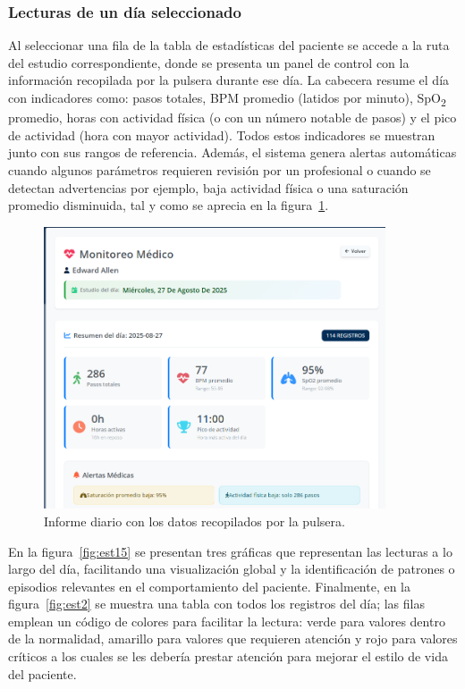 \documentclass[12pt, a4paper]{article}
\begin{document}
\begin{umaappendices}
	\subsubsection{Lecturas de un día seleccionado}

	Al seleccionar una fila de la tabla de estadísticas del paciente se accede a la ruta del estudio correspondiente, donde se presenta un panel de control con la información recopilada por la pulsera durante ese día. La cabecera resume el día con indicadores como: pasos totales, BPM promedio (latidos por minuto), SpO\textsubscript{2} promedio, horas con actividad física (o con un número notable de pasos) y el pico de actividad (hora con mayor actividad). Todos estos indicadores se muestran junto con sus rangos de referencia. Además, el sistema genera alertas automáticas cuando algunos parámetros requieren revisión por un profesional o cuando se detectan advertencias por ejemplo, baja actividad física o una saturación promedio disminuida, tal y como se aprecia en la figura~\ref{fig:est1}.

	\begin{figure}[htbp]
		\centering
		\includegraphics[width=0.9\textwidth]{images/8_estudio1.png}
		\caption[Ejemplo]{Informe diario con los datos recopilados por la pulsera.}
		\label{fig:est1}
	\end{figure}
			\label{sec:dia}
	En la figura~\ref{fig:est15} se presentan tres gráficas que representan las lecturas a lo largo del día, facilitando una visualización global y la identificación de patrones o episodios relevantes en el comportamiento del paciente. Finalmente, en la figura~\ref{fig:est2} se muestra una tabla con todos los registros del día; las filas emplean un código de colores para facilitar la lectura: verde para valores dentro de la normalidad, amarillo para valores que requieren atención y rojo para valores críticos a los cuales se les debería prestar atención para mejorar el estilo de vida del paciente.
	

\end{umaappendices}
\end{document}
